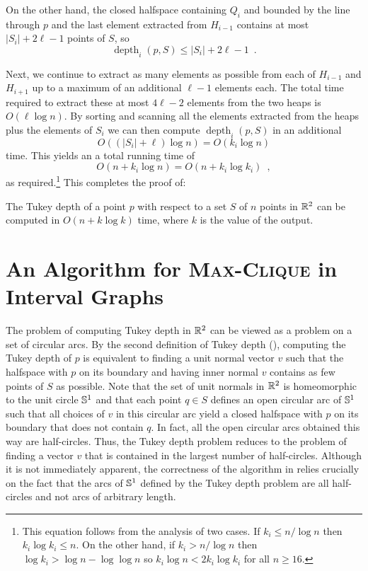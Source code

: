 \documentclass[12pt]{article}
\DeclareMathOperator{\td}{depth}
\begin{document}
On the other hand, the closed halfspace containing $Q_i$ and bounded by the line through
$p$ and the last element extracted from $H_{i-1}$ contains at most
$|S_i|+2\ell -1$ points of $S$, so
\[
  \td_i(p,S) \le |S_i| + 2\ell-1  \enspace .
\]

Next, we continue to extract as many elements as possible from each of
$H_{i-1}$ and $H_{i+1}$ up to a maximum of an additional $\ell-1$
elements each. The total time required to extract these at most
$4\ell-2$ elements from the two heaps is $O(\ell\log n)$.  By sorting and
scanning all the elements extracted from the heaps plus the elements of
$S_i$ we can then compute $\td_i(p,S)$ in an additional
\[
     O((|S_i|+\ell)\log n) = O(k_i\log n)
\] 
time.  This yields an a total running time of 
\[  
   O(n + k_i\log n) = O(n + k_i\log k_i) \enspace ,
\]
as required.\footnote{This equation follows from the analysis of two cases. If
$k_i \le n/\log n$ then $k_i\log k_i \le n$.  On the other hand, if $k_i >
n/\log n$ then $\log k_i > \log n - \log\log n$ so $k_i\log n <
2k_i\log k_i$ for all $n\ge 16$.}  This completes the proof of:

\begin{thm}
The Tukey depth of a point $p$ with respect to a set $S$ of $n$ points
in $\mathbb{R}^2$ can be computed in $O(n + k\log k)$ time, where
$k$ is the value of the output.
\end{thm}

\section{An Algorithm for \textsc{Max-Clique} in Interval Graphs}

The problem of computing Tukey depth in $\mathbb{R}^2$ can be viewed as a
problem on a set of circular arcs.  By the second definition of Tukey
depth (), computing the Tukey depth of $p$ is
equivalent to finding a unit normal vector $v$ such that the halfspace
with $p$ on its boundary and having inner normal $v$ contains as few
points of $S$ as possible.  Note that the set of unit normals in
$\mathbb{R}^2$ is homeomorphic to the unit circle $\mathbb{S}^1$ and that each point
$q\in S$ defines an open circular arc of $\mathbb{S}^1$ such that all choices
of $v$ in this circular arc yield a closed halfspace with $p$ on its
boundary that does not contain $q$.  In fact, all the open circular
arcs obtained this way are half-circles.  Thus, the Tukey depth problem
reduces to the problem of finding a vector $v$ that is contained in
the largest number of half-circles. Although it is not immediately
apparent, the correctness of the algorithm
in  relies crucially on the fact that the arcs of $\mathbb{S}^1$
defined by the Tukey depth problem are all half-circles and not arcs
of arbitrary length.
\end{document}
